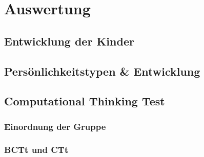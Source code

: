 \chapter{Auswertung}
\section{Entwicklung der Kinder}

\section{Persönlichkeitstypen \& Entwicklung}

\section{Computational Thinking Test}
	\subsection{Einordnung der Gruppe}
	
	\subsection{BCTt und CTt}